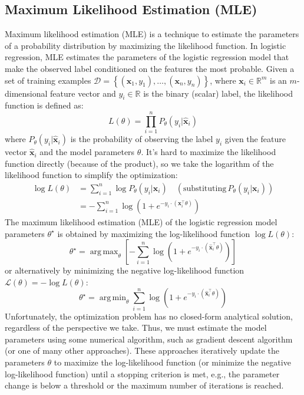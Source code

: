 \documentclass{article}[11pt]
\DeclareMathOperator*{\argmin}{arg\,min}
\DeclareMathOperator*{\argmax}{arg\,max}
\begin{document}
\subsection{Maximum Likelihood Estimation (MLE)}
Maximum likelihood estimation (MLE) is a technique to estimate the parameters of a probability distribution by maximizing the likelihood function.
In logistic regression, MLE estimates the parameters of the logistic regression model that make the observed label conditioned on the features the most probable.
Given a set of training examples $\mathcal{D} = \left\{\left(\mathbf{x}_{1}, y_{1}\right),\dots,\left(\mathbf{x}_{n}, y_{n}\right)\right\}$, where $\mathbf{x}_{i}\in\mathbb{R}^{m}$ is an $m$-dimensional feature vector 
and $y_{i}\in\mathbb{R}$ is the binary (scalar) label, the likelihood function is defined as:
\begin{equation}
L(\theta) = \prod_{i=1}^{n}P_{\theta}(y_{i}|\hat{\mathbf{x}}_{i})
\end{equation}
where $P_{\theta}(y_{i}|\hat{\mathbf{x}}_{i})$ is the probability of observing the label $y_{i}$ given the feature vector $\hat{\mathbf{x}}_{i}$ and the model parameters $\theta$.
It's hard to maximize the likelihood function directly (because of the product), so we take the logarithm of the likelihood function to simplify the optimization:
\begin{align*}
\log{L}(\theta) & = \sum_{i=1}^{n}\log P_{\theta}(y_{i}|\mathbf{x}_{i})\quad(\text{substituting}\,P_{\theta}(y_{i}|\mathbf{x}_{i}))\\
    & = -\sum_{i=1}^{n}\log\left(1 + e^{-y_{i}\cdot\left(\mathbf{x}_{i}^{\top}\theta\right)}\right)
\end{align*}
The maximum likelihood estimation (MLE) of the logistic regression model parameters $\theta^{\star}$ is obtained by maximizing the log-likelihood function
$\log{L}(\theta)$:
\begin{equation}
\theta^{\star} = \argmax_{\theta}\left[-\sum_{i=1}^{n}\log\left(1 + e^{-y_{i}\cdot\left(\hat{\mathbf{x}}^{\top}_{i}\theta\right)}\right)\right]
\end{equation}
or alternatively by minimizing the negative log-likelihood function $\mathcal{L}(\theta) = -\log{L}(\theta)$:
\begin{equation}
    \theta^{\star}  = \argmin_{\theta} \sum_{i=1}^{n}\log\left(1 + e^{-y_{i}\cdot\left(\hat{\mathbf{x}}^{\top}_{i}\theta\right)}\right)
\end{equation}
Unfortunately, the optimization problem has no closed-form analytical solution, regardless of the perspective we take.
Thus, we must estimate the model parameters using some numerical algorithm, such as gradient descent algorithm (or one of many other approaches).
These approaches iteratively update the parameters $\theta$ to maximize the log-likelihood function (or minimize the negative log-likelihood function)
until a stopping criterion is met, e.g., the parameter change is below a threshold or the maximum number of iterations is reached.
\end{document}
